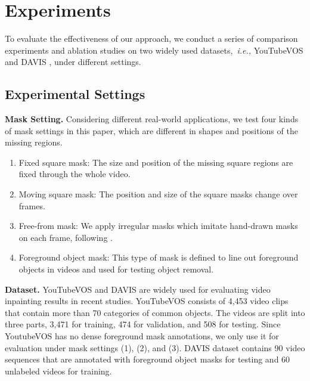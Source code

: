 
\section{Experiments}\label{sec:exp}
To evaluate the effectiveness of our approach, we conduct a series of comparison experiments and ablation studies on two widely used datasets,~\emph{i.e.,} YouTubeVOS \cite{xu2018Youtube} and DAVIS \cite{davis_2017}, under different settings.

\subsection{Experimental Settings}
\noindent \textbf{Mask Setting.} Considering different real-world applications, we test four kinds of mask settings in this paper, which are different in shapes and positions of the missing regions. 
\begin{enumerate}
\item Fixed square mask: The size and position of the missing square regions are fixed through the whole video. 
\item Moving square mask: The position and size of the square masks change over frames. 
\item Free-from mask: We apply irregular masks which imitate hand-drawn masks on each frame, following \cite{liu2018partialinpainting}. 
\item Foreground object mask: This type of mask is defined to line out foreground objects in videos and used for testing object removal.
\end{enumerate}

\noindent\textbf{Dataset.} 
YouTubeVOS and DAVIS are widely used for evaluating video inpainting results in recent studies.
YouTubeVOS consists of 4,453 video clips that contain more than 70 categories of common objects. 
The videos are split into three parts, 3,471 for training, 474 for validation, and 508 for testing. Since YoutubeVOS has no dense foreground mask annotations, we only use it for evaluation under mask settings (1), (2), and (3). 
% 
DAVIS dataset contains 90 video sequences that are annotated with foreground object masks for testing and 60 unlabeled videos for training.






